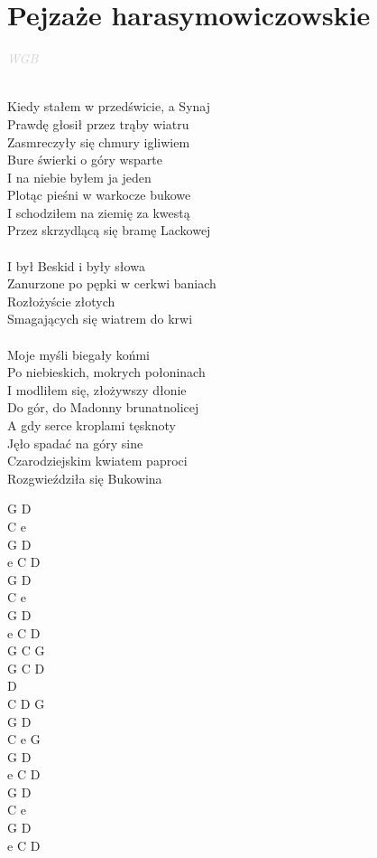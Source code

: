 \documentclass[a5paper, 10pt]{book}
\begin{document}
\section{Pejzaże harasymowiczowskie}\textcolor{lightgray}{\textit{WGB}}\\~\\
\begin{minipage}[t]{0.8\textwidth}
Kiedy stałem w przedświcie, a Synaj\\
Prawdę głosił przez trąby wiatru\\
Zasmreczyły się chmury igliwiem\\
Bure świerki o góry wsparte\\
I na niebie byłem ja jeden\\
Plotąc pieśni w warkocze bukowe\\
I schodziłem na ziemię za kwestą\\
Przez skrzydlącą się bramę Lackowej\\
\\
\hspace*{5mm}I był Beskid i były słowa\\
\hspace*{5mm}Zanurzone po pępki w cerkwi baniach\\
\hspace*{5mm}Rozłożyście złotych\\
\hspace*{5mm}Smagających się wiatrem do krwi\\
\\
Moje myśli biegały końmi\\
Po niebieskich, mokrych połoninach\\
I modliłem się, złożywszy dłonie\\
Do gór, do Madonny brunatnolicej\\
A gdy serce kroplami tęsknoty\\
Jęło spadać na góry sine\\
Czarodziejskim kwiatem paproci\\
Rozgwieździła się Bukowina\\
\end{minipage}
\begin{minipage}[t]{0.2\textwidth}
G D \\
C e \\
G D \\
e C D\\
G D \\
C e \\
G D \\
e C D\\

 G  C G\\
G C D\\
D \\
 C D G\\

 G  D \\
C e G\\
G D \\
e C D\\
G D \\
C e \\
G D \\
e C D\\
\end{minipage}
\end{document}
